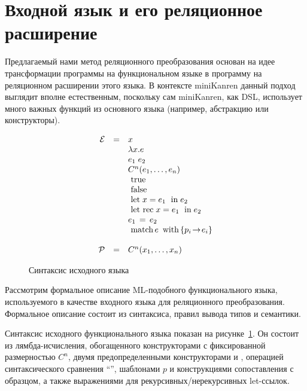\section{Входной язык и его реляционное расширение}

Предлагаемый нами метод реляционного преобразования основан на идее трансформации программы на функциональном языке в программу на реляционном расширении этого языка.
В контексте miniKanren данный подход выглядит вполне естественным, поскольку сам miniKanren, как DSL, использует много важных функций из основного языка (например, абстракцию или конструкторы).

\begin{figure}
\centering
$$
\begin{array}{rcl}
 \mathcal E &=&x\\
     & &\lambda x.e\\
     & &e_1\;e_2\\
     & &C^n(e_1,\dots, e_n)\\
     & &\inmath{true}\\
     & &\inmath{false}\\
     & &\Let{x}{e_1}{e_2}\\
     & &\LetR{x}{e_1}{e_2}\\
     & &e_1\,=\,e_2\\
     & &\Match{e}{p_i}{e_i}\\
     & &\\
 \mathcal P &=&C^n(x_1,\dots,x_n)\\
\end{array}
$$\vspace*{-5mm}
\caption{Синтаксис исходного языка}
\label{functional_syntax}
\end{figure}

Рассмотрим формальное описание ML-подобного функционального языка, используемого в качестве входного языка для реляционного преобразования. Формальное описание состоит из синтаксиса, правил вывода типов и семантики.

\FloatBarrier

Синтаксис исходного функционального языка показан на рисунке~\ref{functional_syntax}.
Он состоит из лямбда-исчисления, обогащенного конструкторами с фиксированной размерностью $C^n$, двумя предопределенными конструкторами  и , операцией синтаксического сравнения ``\code{=}'', шаблонами $p$ и конструкциями сопоставления с образцом, а также выражениями для рекурсивных/нерекурсивных let-ссылок.

